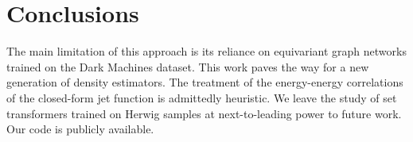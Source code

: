 \section{Conclusions}\label{sec:conclusions}

The main limitation of this approach is its reliance on equivariant
graph networks trained on the Dark Machines dataset. This work paves the
way for a new generation of density estimators. The treatment of the
energy-energy correlations of the closed-form jet function is admittedly
heuristic. We leave the study of set transformers trained on Herwig
samples at next-to-leading power to future work. Our code is publicly
available.

